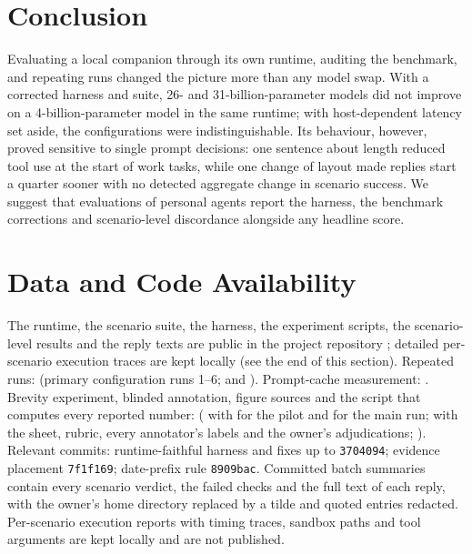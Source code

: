 \documentclass[11pt,a4paper]{article}
\begin{document}
\section{Conclusion}
Evaluating a local companion through its own runtime, auditing the benchmark, and repeating runs changed the picture more than any model swap. With a corrected harness and suite, 26- and 31-billion-parameter models did not improve on a 4-billion-parameter model in the same runtime; with host-dependent latency set aside, the configurations were indistinguishable. Its behaviour, however, proved sensitive to single prompt decisions: one sentence about length reduced tool use at the start of work tasks, while one change of layout made replies start a quarter sooner with no detected aggregate change in scenario success. We suggest that evaluations of personal agents report the harness, the benchmark corrections and scenario-level discordance alongside any headline score.

\section*{Data and Code Availability}\label{sec:availability}
The runtime, the scenario suite, the harness, the experiment scripts, the scenario-level results and the reply texts are public in the project repository \cite{b12}; detailed per-scenario execution traces are kept locally (see the end of this section). Repeated runs:  (primary configuration runs 1--6;  and ). Prompt-cache measurement: . Brevity experiment, blinded annotation, figure sources and the script that computes every reported number:  ( with  for the pilot and  for the main run;  with the sheet, rubric, every annotator's labels and the owner's adjudications; ). Relevant commits: runtime-faithful harness and fixes up to \texttt{3704094}; evidence placement \texttt{7f1f169}; date-prefix rule \texttt{8909bac}. Committed batch summaries contain every scenario verdict, the failed checks and the full text of each reply, with the owner's home directory replaced by a tilde and quoted  entries redacted. Per-scenario execution reports with timing traces, sandbox paths and tool arguments are kept locally and are not published.



\end{document}
